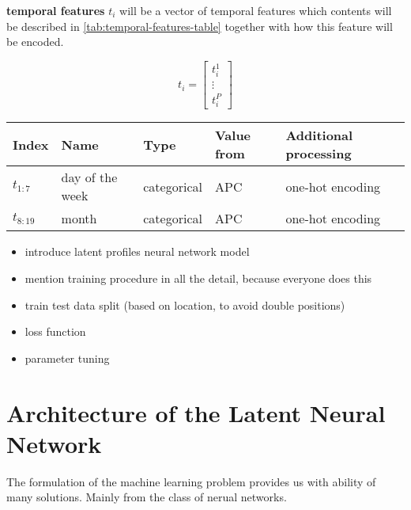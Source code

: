 \textbf{temporal features} $t_i$ will be a vector of temporal features which contents will be described in \ref{tab:temporal-features-table} together with how this feature will be encoded.

\begin{equation}
    t_i = \begin{bmatrix}
        t_i^1  \\
        \vdots \\
        t_i^P
    \end{bmatrix}
\end{equation}

\begin{table*}[h!]
    \caption{Overview of temporal pattern used in feature vector.}
    \label{tab:temporal-features-table}
    \begin{tabular}{p{1cm} p{3.5cm} p{1.8cm} p{3.5cm} p{4.5cm}}
        \toprule
        \textbf{Index} & \textbf{Name}   & \textbf{Type} & \textbf{Value from} & \textbf{Additional processing} \\
        \midrule
        $t_{1:7}$      & day of the week & categorical   & \acrfull{APC}       & one-hot encoding               \\
        $t_{8:19}$     & month           & categorical   & \acrfull{APC}       & one-hot encoding               \\
        \bottomrule
    \end{tabular}
\end{table*}

\begin{itemize}
    \item introduce latent profiles neural network model
    \item mention training procedure in all the detail, because everyone does this
    \item train test data split (based on location, to avoid double positions)
    \item loss function
    \item parameter tuning
\end{itemize}

\section{Architecture of the Latent Neural Network}

The formulation of the machine learning problem provides us with ability of many solutions. Mainly from the class of nerual networks.

